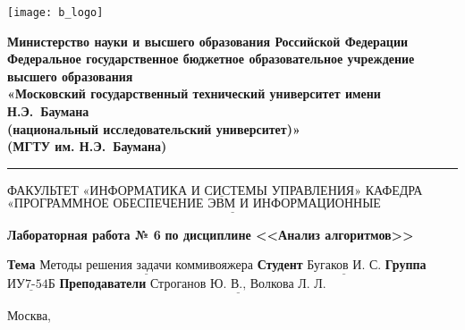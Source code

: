 \thispagestyle{empty}

\noindent \begin{minipage}{0.15\textwidth}
	\texttt{[image: b\_logo]}
\end{minipage}
\noindent\begin{minipage}{0.85\textwidth}\centering
	\textbf{Министерство науки и высшего образования Российской Федерации}\\
	\textbf{Федеральное государственное бюджетное образовательное учреждение высшего образования}\\
	\textbf{«Московский государственный технический университет имени Н.Э.~Баумана}\\
	\textbf{(национальный исследовательский университет)»}\\
	\textbf{(МГТУ им. Н.Э.~Баумана)}
\end{minipage}

\noindent\rule{\linewidth}{3pt}
\newline\newline
\noindent ФАКУЛЬТЕТ $\underline{\text{«ИНФОРМАТИКА И СИСТЕМЫ УПРАВЛЕНИЯ»}}$ \newline\newline
\noindent КАФЕДРА $\underline{\text{«ПРОГРАММНОЕ ОБЕСПЕЧЕНИЕ ЭВМ И ИНФОРМАЦИОННЫЕ ТЕХНОЛОГИИ»}}$

\vspace{1cm}

\begin{center}
	\noindent\begin{minipage}{1.3\textwidth}\centering
		\Large\textbf{  Лабораторная работа № 6}\newline
		\textbf{по дисциплине <<Анализ алгоритмов>>}\newline\newline
	\end{minipage}
\end{center}

\noindent\textbf{Тема} $\underline{\text{Методы решения задачи коммивояжера}}$\newline\newline
\noindent\textbf{Студент} $\underline{\text{Бугаков И. С.}}$\newline\newline
\noindent\textbf{Группа} $\underline{\text{ИУ7-54Б}}$\newline\newline
\noindent\textbf{Преподаватели} $\underline{\text{Строганов Ю. В., Волкова Л. Л.}}$\newline

\begin{center}
	\vfill
	Москва,~\the\year
\end{center}
\clearpage